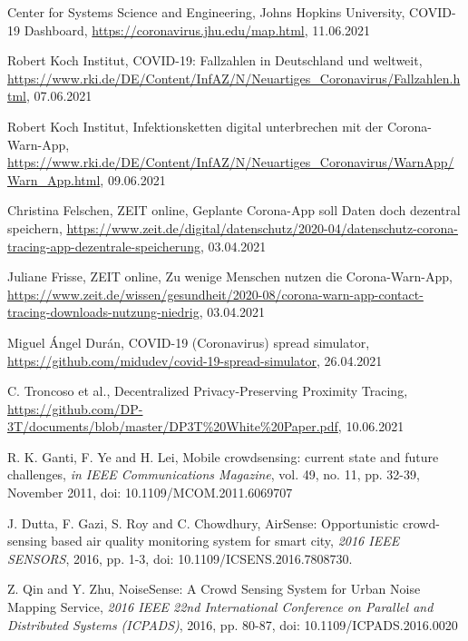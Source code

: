\documentclass[conference,compsoc]{IEEEtran}
\begin{document}
\begin{thebibliography}{00}
 Center for Systems Science and Engineering, Johns Hopkins University, \glqq COVID-19 Dashboard\grqq, \url{https://coronavirus.jhu.edu/map.html}, 11.06.2021

 Robert Koch Institut, \glqq COVID-19: Fallzahlen in Deutschland und weltweit\grqq,\\ \url{https://www.rki.de/DE/Content/InfAZ/N/Neuartiges_Coronavirus/Fallzahlen.html}, 07.06.2021

Robert Koch Institut, \glqq Infektionsketten digital unterbrechen mit der Corona-Warn-App\grqq,\\ \url{ https://www.rki.de/DE/Content/InfAZ/N/Neuartiges_Coronavirus/WarnApp/Warn_App.html}, 09.06.2021

 Christina Felschen, ZEIT online, \glqq Geplante Corona-App soll Daten doch dezentral speichern\grqq, \url{ https://www.zeit.de/digital/datenschutz/2020-04/datenschutz-corona-tracing-app-dezentrale-speicherung}, 03.04.2021

 Juliane Frisse, ZEIT online, \glqq Zu wenige Menschen nutzen die Corona-Warn-App\grqq, \url{https://www.zeit.de/wissen/gesundheit/2020-08/corona-warn-app-contact-tracing-downloads-nutzung-niedrig}, 03.04.2021

 Miguel Ángel Durán, \glqq COVID-19 (Coronavirus) spread simulator\grqq, \url{https://github.com/midudev/covid-19-spread-simulator}, 26.04.2021

 C. Troncoso et al., \glqq Decentralized Privacy-Preserving Proximity Tracing\grqq, \url{https://github.com/DP-3T/documents/blob/master/DP3T%20White%20Paper.pdf}, 10.06.2021

 R. K. Ganti, F. Ye and H. Lei, \glqq Mobile crowdsensing: current state and future challenges\grqq,\textit{ in IEEE Communications Magazine}, vol. 49, no. 11, pp. 32-39, November 2011, doi: 10.1109/MCOM.2011.6069707

 J. Dutta, F. Gazi, S. Roy and C. Chowdhury, \glqq AirSense: Opportunistic crowd-sensing based air quality monitoring system for smart city\grqq, \textit{ 2016 IEEE SENSORS}, 2016, pp. 1-3, doi: 10.1109/ICSENS.2016.7808730.

 Z. Qin and Y. Zhu, \glqq NoiseSense: A Crowd Sensing System for Urban Noise Mapping Service\grqq, \textit{2016 IEEE 22nd International Conference on Parallel and Distributed Systems (ICPADS)}, 2016, pp. 80-87, doi: 10.1109/ICPADS.2016.0020


\end{thebibliography}
\end{document}
